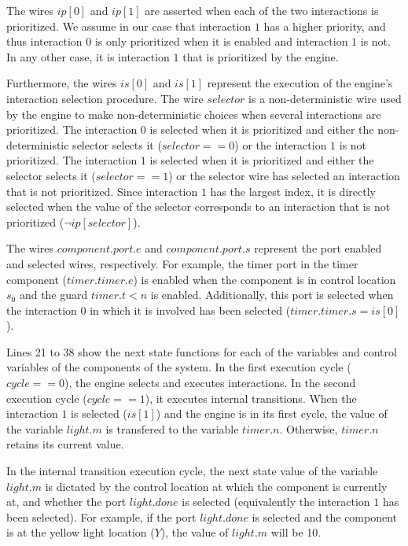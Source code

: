 The wires $ip[0]$ and $ip[1]$ are asserted when each of the two interactions 
is prioritized. We assume in our case that interaction $1$ has a higher
priority, and thus interaction $0$ is only prioritized when it is enabled
and interaction $1$ is not. In any other case, it is interaction $1$ that
is prioritized by the engine. 

Furthermore, the wires $is[0]$ and $is[1]$ represent the execution of the 
engine's interaction selection procedure. The wire $selector$ is
a non-deterministic wire used by the engine to make non-deterministic
choices when several interactions are prioritized. 
The interaction $0$ is selected
when it is prioritized and either the non-deterministic selector 
selects it ($selector == 0$)
or the interaction $1$ is not prioritized. 
The interaction $1$ is selected when it is prioritized and either 
the selector selects it ($selector == 1$) or the selector wire
has selected an interaction that is not prioritized. Since interaction
$1$ has the largest index, it is
directly selected when the value of the selector corresponds
to an interaction that is not prioritized ($\lnot ip[selector]$).

The wires $component.port.e$ and $component.port.s$ represent the 
port enabled and selected wires, respectively. 
For example, the timer port 
in the timer component ($timer.timer.e$) is enabled when the 
component is in control location $s_0$ and the guard $timer.t < n$ is
enabled. Additionally, this port is selected when the interaction $0$ 
in which it is involved has been selected ($timer.timer.s = is[0]$).

Lines 21 to 38 show the next state functions for each of the variables
and control variables of the components of the system. 
In the first execution cycle ($cycle == 0$), 
the engine selects and executes interactions.
In the second execution cycle ($cycle == 1$), 
it executes internal transitions. 
When the interaction $1$ is selected ($is[1]$) and the engine is 
in its first cycle, the value of the variable $light.m$ is transfered
to the variable $timer.n$. Otherwise, $timer.n$ retains its current
value.

In the internal transition execution cycle, the next state value of
the variable $light.m$ is dictated by the control location at which the component is currently at, and whether the port $light.done$
is selected (equivalently the interaction $1$ has been selected).
For example, if the port $light.done$ is selected and the component 
is at the yellow light location ($Y$), the value of
$light.m$ will be 10. 

